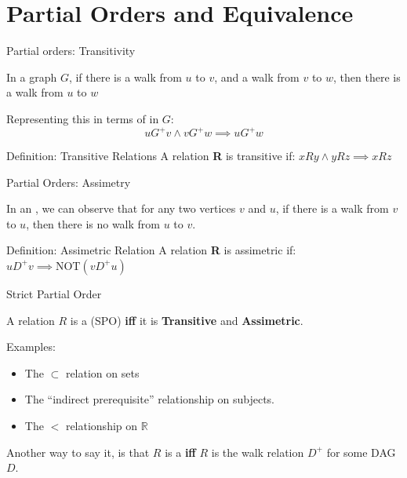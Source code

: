 \section{Partial Orders and Equivalence}

\begin{frame}{Partial orders: Transitivity}

  In a graph $G$, if there is a walk from $u$ to $v$, and a walk from $v$ to $w$, then there is a walk from $u$ to $w$
  \begin{center}
  \end{center}\bigskip

  Representing this in terms of  in $G$:
  \begin{equation*}
    uG^+v \land vG^+w \implies uG^+w
  \end{equation*}\bigskip

  \begin{block}{Definition: Transitive Relations}
    A relation {\bf R} is transitive if:\hspace{1cm} $xRy \land yRz \implies xRz$
  \end{block}
\end{frame}

\begin{frame}{Partial Orders: Assimetry}

  In an , we can observe that for any two vertices $v$ and $u$, if there is a walk from $v$ to $u$, then there is no walk from $u$ to $v$.\bigskip

  \begin{block}{Definition: Assimetric Relation}
    A relation {\bf R} is assimetric if: $uD^+v \implies \text{NOT}(vD^+u)$
  \end{block}
\end{frame}

\begin{frame}{Strict Partial Order}

  A relation $R$ is a (SPO) {\bf iff} it is {\bf Transitive} and {\bf Assimetric}.\bigskip

  Examples:
  \begin{itemize}
  \item The $\subset$ relation on sets
  \item The ``indirect prerequisite'' relationship on subjects.
  \item The $<$ relationship on $\mathbb{R}$
  \end{itemize}\bigskip

  Another way to say it, is that $R$ is a  {\bf iff} $R$ is the walk relation $D^+$ for some DAG $D$.
\end{frame}

